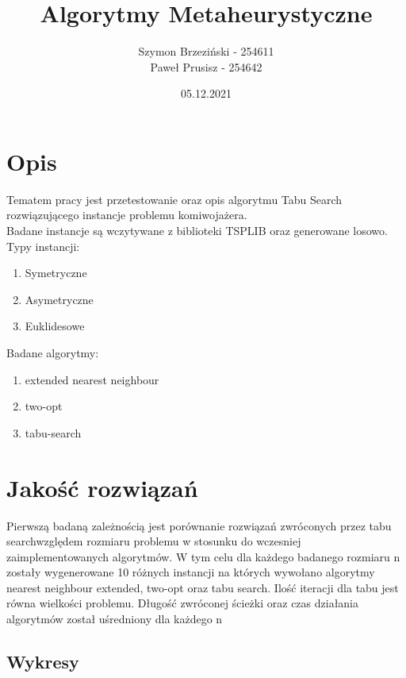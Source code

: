 \documentclass[11pt]{article}
\title{Algorytmy Metaheurystyczne}
\author{Szymon Brzeziński - 254611 \\
Paweł Prusisz - 254642}
\date{05.12.2021}
\begin{document}
\maketitle


\section{Opis}
    Tematem pracy jest przetestowanie oraz opis algorytmu Tabu Search rozwiązującego instancje problemu komiwojażera.
    \\Badane instancje są wczytywane z biblioteki TSPLIB oraz generowane losowo.
    \\Typy instancji:
    \begin{enumerate}
        \item Symetryczne
        \item Asymetryczne
        \item Euklidesowe
    \end{enumerate}
    Badane algorytmy:
    \begin{enumerate}
        \item extended nearest neighbour
        \item two-opt
        \item tabu-search
    \end{enumerate}

\section{Jakość rozwiązań}
    Pierwszą badaną zależnością jest porównanie rozwiązań zwróconych przez
    tabu searchwzględem rozmiaru problemu w stosunku do wczesniej zaimplementowanych algorytmów. 
    W tym celu dla każdego badanego rozmiaru n zostały wygenerowane 10 różnych instancji na których wywołano 
    algorytmy nearest neighbour extended, two-opt oraz tabu search. 
    Ilość iteracji dla tabu jest równa wielkości problemu.
    Długość zwróconej ścieżki oraz czas działania algorytmów został uśredniony dla każdego n

    \subsection{Wykresy}
\end{document}
